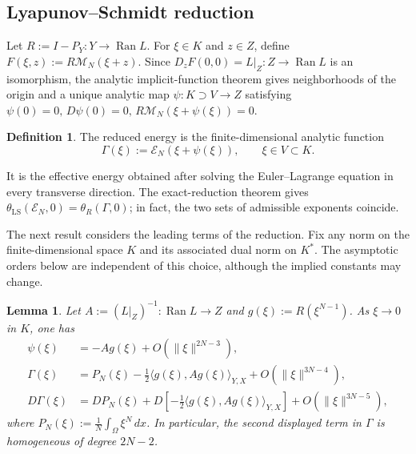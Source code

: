 \documentclass[11pt]{article}
\newtheorem{lemma}[theorem]{Lemma}
\theoremstyle{definition}
\newtheorem{definition}[theorem]{Definition}
\theoremstyle{remark}
\begin{document}
\subsection{Lyapunov--Schmidt reduction}

Let $R:=I-P_Y:Y\to \operatorname{Ran}  L$. For $\xi\in K$ and $z\in Z$, define $F(\xi,z):=R \mathcal{M}_N(\xi+z)$.
Since $D_zF(0,0)=L|_Z:Z\to\operatorname{Ran}L$ is an isomorphism, the analytic implicit-function theorem gives neighborhoods of the origin and a unique analytic map
$\psi:K\supset V\longrightarrow Z $
satisfying $\psi(0)=0, \, D\psi(0)=0, \, R \mathcal{M}_N(\xi+\psi(\xi))=0$.

\begin{definition}
The reduced energy is the finite-dimensional analytic function
$$\Gamma(\xi):=\mathcal{E}_N(\xi+\psi(\xi)), \qquad \xi\in V\subset K. $$
\end{definition}

It is the effective energy obtained after solving the Euler--Lagrange equation in every transverse direction. The exact-reduction theorem gives $\theta_{\mathrm{LS}}(\mathcal E_N,0)=\theta_R(\Gamma,0)$; in fact, the two sets of admissible exponents coincide.

\smallskip
The next result considers the leading terms of the reduction. Fix any norm on the finite-dimensional space $K$ and its associated dual norm on $K^*$. The asymptotic orders below are independent of this choice, although the implied constants may change.

\begin{lemma}  \label{lem:leading}
Let $A:=(L|_Z)^{-1}:\operatorname{Ran}L\to Z$ and $g(\xi):=R(\xi^{N-1})$. As $\xi\to0$ in $K$, one has
\begin{align*}
\psi(\xi)
&=-A g(\xi)+O(\|\xi\|^{2N-3}),\\
\Gamma(\xi)
&=P_N(\xi)-\frac12\langle g(\xi),A g(\xi)\rangle_{Y,X}
  +O(\|\xi\|^{3N-4}),\\
D\Gamma(\xi)
&=DP_N(\xi)
  +D\!\left[-\frac12\langle g(\xi),A g(\xi)\rangle_{Y,X}\right]
  +O(\|\xi\|^{3N-5}),
\end{align*}
where $P_N(\xi):=\frac1N\int_\Omega\xi^N\,dx$. In particular, the second displayed term in $\Gamma$ is homogeneous of degree $2N-2$.
\end{lemma}
\end{document}
